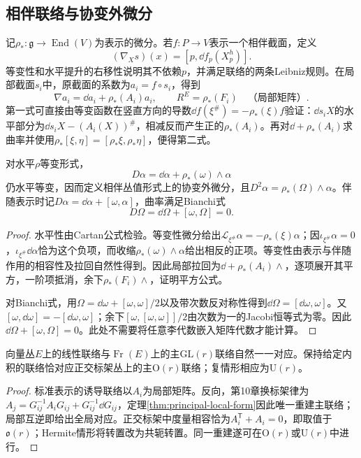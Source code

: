 \subsection{相伴联络与协变外微分}
记$\rho_*:\mathfrak g\to\operatorname{End}(V)$为表示的微分。若$f:P\to V$表示一个相伴截面，定义
\[
 (\nabla_Xs)(x)=[p,\dd f_p(X^h_p)].
\]
等变性和水平提升的右移性说明其不依赖$p$，并满足联络的两条Leibniz规则。在局部截面$s_i$中，原截面的系数为$a_i=f\circ s_i$，得到
\begin{equation}\label{eq:associated-connection}
 \nabla a_i=\dd a_i+\rho_*(A_i)a_i,\qquad
 R^E=\rho_*(F_i)\quad\text{（局部矩阵）}.
\end{equation}
第一式可直接由等变函数在竖直方向的导数$\dd f(\xi^\#)=-\rho_*(\xi)f$验证：$\dd s_iX$的水平部分为$\dd s_iX-(A_i(X))^\#$，相减反而产生正的$\rho_*(A_i)$。再对$\dd+\rho_*(A_i)$求曲率并使用$\rho_*[\xi,\eta]=[\rho_*\xi,\rho_*\eta]$，便得第二式。

\begin{theorem}\label{thm:principal-covariant-exterior}
对水平$\rho$等变形式，
\[
 D\alpha=\dd\alpha+\rho_*(\omega)\wedge\alpha
\]
仍水平等变，因而定义相伴丛值形式上的协变外微分，且$D^2\alpha=\rho_*(\Omega)\wedge\alpha$。伴随表示时记$D\alpha=\dd\alpha+[\omega,\alpha]$，曲率满足Bianchi式
\begin{equation}\label{eq:principal-bianchi}
 D\Omega=\dd\Omega+[\omega,\Omega]=0.
\end{equation}
\end{theorem}
\begin{proof}
水平性由Cartan公式检验。等变性微分给出$\mathcal L_{\xi^\#}\alpha=-\rho_*(\xi)\alpha$；因$\iota_{\xi^\#}\alpha=0$，$\iota_{\xi^\#}\dd\alpha$恰为这个负项，而收缩$\rho_*(\omega)\wedge\alpha$给出相反的正项。等变性由表示与伴随作用的相容性及拉回自然性得到。因此局部拉回为$\dd+\rho_*(A_i)\wedge$，逐项展开其平方，一阶项抵消，余下$\rho_*(F_i)\wedge$，证明平方公式。

对Bianchi式，用$\Omega=\dd\omega+[\omega,\omega]/2$以及带次数反对称性得到$\dd\Omega=[\dd\omega,\omega]$。又$[\omega,\dd\omega]=-[\dd\omega,\omega]$；余下$[\omega,[\omega,\omega]]/2$由次数为一的Jacobi恒等式为零。因此$\dd\Omega+[\omega,\Omega]=0$。此处不需要将任意李代数嵌入矩阵代数才能计算。
\end{proof}

\begin{proposition}\label{prop:frame-connection-equivalence}
向量丛$E$上的线性联络与$\operatorname{Fr}(E)$上的主$\mathrm{GL}(r)$联络自然一一对应。保持给定内积的联络恰对应正交标架丛上的主$\mathrm O(r)$联络；复情形相应为$\mathrm U(r)$。
\end{proposition}
\begin{proof}
标准表示的诱导联络以$A_i$为局部矩阵。反向，第10章换标架律为$A_j=G_{ij}^{-1}A_iG_{ij}+G_{ij}^{-1}\dd G_{ij}$，定理\ref{thm:principal-local-form}因此唯一重建主联络；局部互逆即给出全局对应。正交标架中度量相容恰为$A_i^{\mathsf T}+A_i=0$，即取值于$\mathfrak o(r)$；Hermite情形将转置改为共轭转置。同一重建遂可在$\mathrm O(r)$或$\mathrm U(r)$中进行。
\end{proof}

